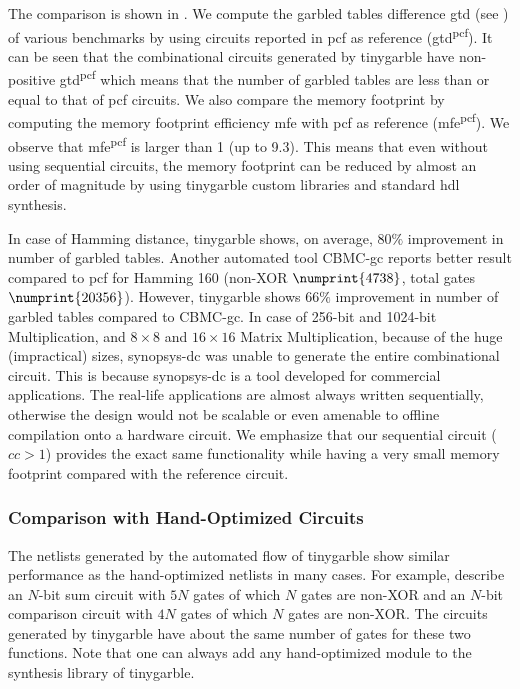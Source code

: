 The comparison is shown in .
We compute the garbled tables difference \acrshort{gtd} (see ) of various benchmarks by using circuits reported in \gls{pcf} as reference (\acrshort{gtd}\textsuperscript{\gls{pcf}}).
It can be seen that the combinational circuits generated by \gls{tinygarble} have non-positive \acrshort{gtd}\textsuperscript{\gls{pcf}} which means that the number of garbled tables are less than or equal to that of \gls{pcf} circuits.
We also compare the memory footprint by computing the memory footprint efficiency \acrshort{mfe} with \gls{pcf} as reference (\acrshort{mfe}\textsuperscript{\gls{pcf}}).
We observe that \acrshort{mfe}\textsuperscript{\gls{pcf}} is larger than 1 (up to 9.3).
This means that even without using sequential circuits, the memory footprint can be reduced by almost an order of magnitude by using \gls{tinygarble} custom libraries and standard \acrshort{hdl} synthesis.

In case of Hamming distance, \gls{tinygarble} shows, on average, $80\%$ improvement in number of garbled tables.
Another automated tool CBMC-\acrshort{gc} \cite{franz2014cbmc} reports better result compared to \gls{pcf} for Hamming 160 (non-XOR $\numprint{4738}$, total gates $\numprint{20356}$).
However, \gls{tinygarble} shows $66\%$ improvement in number of garbled tables compared to CBMC-\acrshort{gc}.
In case of 256-bit and 1024-bit Multiplication, and $8\times 8$ and $16\times 16$ Matrix Multiplication, because of the huge (impractical) sizes, \gls{synopsys-dc} was unable to generate the entire combinational circuit.
This is because \gls{synopsys-dc} is a tool developed for commercial applications.
The real-life applications are almost always written sequentially, otherwise the design would not be scalable or even amenable to offline compilation onto a hardware circuit.
We emphasize that our sequential circuit ($cc>1$) provides the exact same functionality while having a very small memory footprint compared with the reference circuit.

\subsubsection{Comparison with Hand-Optimized Circuits} \label{sssec:eval-tinygarble-comb-hand}
The \gls{netlist}s generated by the automated flow of \gls{tinygarble} show similar performance as the hand-optimized \gls{netlist}s in many cases.
For example, \cite{kolesnikov2009improved} describe an $N$-bit sum circuit with $5N$ gates of which $N$ gates are non-XOR and an $N$-bit comparison circuit with $4N$ gates of which $N$ gates are non-XOR.
The circuits generated by \gls{tinygarble} have about the same number of gates for these two functions.
Note that one can always add any hand-optimized module to the synthesis library of \gls{tinygarble}.

